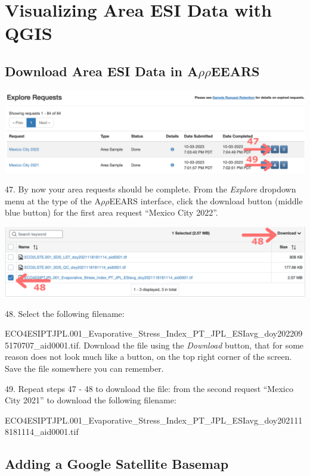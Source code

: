 \documentclass[oneside,a4paper,11pt,explicit]{book}
\begin{document}
\section{Visualizing Area ESI Data with QGIS}

\subsection{Download Area ESI Data in A$\rho\rho$EEARS}

\centerline{\includegraphics[width=.6\textwidth]{ESIareaRequestDown.png}}

\vspace{.5em}

47. By now your area requests should be complete. From the \textit{Explore} dropdown menu at the type of the A$\rho\rho$EEARS interface, click the download button (middle blue button) for the first area request ``Mexico City 2022''. 

\vspace{.5em}

\centerline{\includegraphics[width=.6\textwidth]{ESIareaDownload.png}}

\vspace{.5em}

48. Select the following filename: 

ECO4ESIPTJPL.001\_Evaporative\_Stress\_Index\_PT\_JPL\_ESIavg\_doy2022095170707\_aid0001.tif. Download the file using the \textit{Download} button, that for some reason does not look much like a button, on the top right corner of the screen. Save the file somewhere you can remember. 

49. Repeat steps 47 - 48 to download the file: from the second request ``Mexico City 2021'' to download the following filename: 

ECO4ESIPTJPL.001\_Evaporative\_Stress\_Index\_PT\_JPL\_ESIavg\_doy2021118181114\_aid0001.tif 

\subsection{Adding a Google Satellite Basemap}
\end{document}
